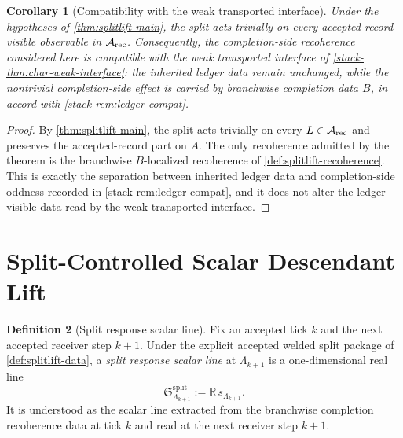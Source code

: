 \documentclass[11pt]{article}
\theoremstyle{definition}
\newtheorem{definition}{Definition}[section]
\theoremstyle{plain}
\newtheorem{corollary}[definition]{Corollary}
\theoremstyle{remark}
\newcommand{\Arec}{\mathcal A_{\rm rec}}
\newcommand{\1}{\mathbf 1}
\begin{document}
\begin{corollary}[Compatibility with the weak transported interface]
\label{cor:splitlift-main}
Under the hypotheses of \cref{thm:splitlift-main}, the split acts trivially on every
accepted-record-visible observable in \(\Arec\).
Consequently, the completion-side recoherence considered here is compatible with the weak
transported interface of \cref{stack-thm:char-weak-interface}: the inherited ledger data remain
unchanged, while the nontrivial completion-side effect is carried by branchwise completion data
\(B\), in accord with \cref{stack-rem:ledger-compat}.
\end{corollary}

\begin{proof}
By \cref{thm:splitlift-main}, the split acts trivially on every \(L\in\Arec\) and preserves the
accepted-record part on \(A\).
The only recoherence admitted by the theorem is the branchwise \(B\)-localized recoherence of
\cref{def:splitlift-recoherence}.
This is exactly the separation between inherited ledger data and completion-side oddness recorded in
\cref{stack-rem:ledger-compat}, and it does not alter the ledger-visible data read by the weak
transported interface.
\end{proof}

\section{Split-Controlled Scalar Descendant Lift}
\label{sec:splitlift-descendant}

\begin{definition}[Split response scalar line]
\label{def:splitlift-scalar-line}
Fix an accepted tick \(k\) and the next accepted receiver step \(k+1\).
Under the explicit accepted welded split package of \cref{def:splitlift-data}, a
\emph{split response scalar line} at \(\Lambda_{k+1}\) is a one-dimensional real line
\[
\mathfrak S^{\mathrm{split}}_{\Lambda_{k+1}}
:=
\mathbb R\,s_{\Lambda_{k+1}}.
\]
It is understood as the scalar line extracted from the branchwise completion recoherence data at
tick \(k\) and read at the next receiver step \(k+1\).
\end{definition}
\end{document}
